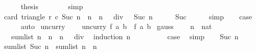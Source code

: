 \begin{isabellebody}
\isanewline
\ \ \ \ \isamarkupfalse%
\ {\isacharquery}thesis\isanewline
\ \ \ \ \ \ \isamarkupfalse%
\ simp\isanewline
\ \ \isamarkupfalse%
\isanewline
\ \ \isamarkupfalse%
\isanewline
\ \ \isamarkupfalse%
\ {\isachardoublequoteopen}card\ {\isacharparenleft}triangle\ r{}\ c{}\ {\isacharparenleft}Suc\ n{\isacharparenright}{\isacharparenright}\ {\isacharequal}\ {\isacharparenleft}n\ {\isacharasterisk}\ {\isacharparenleft}n\ {\isacharplus}\ {}{\isacharparenright}{\isacharparenright}\ div\ {}\ {\isacharplus}\ Suc\ n{\isachardoublequoteclose}\isanewline
\ \ \ \ \isamarkupfalse%
\ Suc\isanewline
\ \ \ \ \isamarkupfalse%
\ simp\isanewline
\ \ \isamarkupfalse%
\ {\isacharquery}case\isanewline
\ \ \ \ \isamarkupfalse%
\ auto\isanewline
{}\isamarkupfalse%
%
\endisatagproof
{\isafoldproof}%
%
\isadelimproof
\isanewline
%
\endisadelimproof
\isanewline
{}\isamarkupfalse%
\ uncurry\ \isanewline
\ \ \ {\isachardoublequoteopen}uncurry\ f\ {\isacharparenleft}a{\isacharcomma}\ b{\isacharparenright}\ {\isacharequal}\ f\ a\ b{\isachardoublequoteclose}\isanewline
\isanewline
{}\isamarkupfalse%
\ gauss{\isacharcolon}\ \isanewline
\ \ \ n\ {\isacharcolon}{\isacharcolon}\ nat\isanewline
\ \ \ {\isachardoublequoteopen}sum{\isacharunderscore}list\ {\isacharbrackleft}{}{\isachardot}{\isachardot}{\isacharless}n{\isacharbrackright}\ {\isacharequal}\ n\ {\isacharasterisk}\ {\isacharparenleft}n\ {\isacharminus}\ {}{\isacharparenright}\ div\ {}{\isachardoublequoteclose}\isanewline
%
\isadelimproof
%
\endisadelimproof
%
\isatagproof
{}\isamarkupfalse%
\ {\isacharparenleft}induction\ n{\isacharparenright}\isanewline
\ \ \isamarkupfalse%
\ {}\isanewline
\ \ \isamarkupfalse%
\ \isamarkupfalse%
\ {\isacharquery}case\ \isamarkupfalse%
\ simp\isanewline
{}\isamarkupfalse%
\isanewline
\ \ \isamarkupfalse%
\ {\isacharparenleft}Suc\ n{\isacharparenright}\isanewline
\ \ \isamarkupfalse%
\ {\isachardoublequoteopen}sum{\isacharunderscore}list\ {\isacharbrackleft}{}{\isachardot}{\isachardot}{\isacharless}Suc\ n{\isacharbrackright}\ {\isacharequal}\ sum{\isacharunderscore}list\ {\isacharbrackleft}{}{\isachardot}{\isachardot}{\isacharless}n{\isacharbrackright}\ {\isacharplus}\ n{\isachardoublequoteclose}\isanewline

\end{isabellebody}
